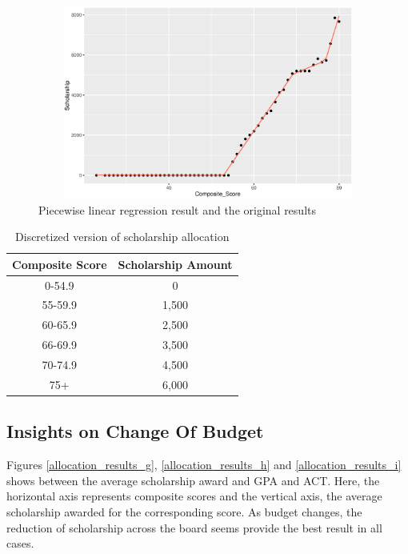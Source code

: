 \documentclass[12pt,english]{report}
\begin{document}
\begin{figure}[ht]
   \centering
 \includegraphics[width=6in, height=2.5in]{pic/PieceWiseRegression.eps}
 \caption{Piecewise linear regression result and the original results}
 \label{PieceWisePolicy}
\end{figure}

\begin{table}[H]
\centering
\begin{tabular}{|c|c|} \hline
Composite Score & Scholarship Amount \\ \hline
0-54.9         & 0              \\ \hline
55-59.9         & 1,500              \\ \hline
60-65.9         & 2,500              \\ \hline
66-69.9         & 3,500              \\ \hline
70-74.9         & 4,500              \\ \hline
75+             & 6,000              \\ \hline
\end{tabular}
\caption{Discretized version of scholarship allocation}
\label{money_result_discrete}

\end{table}

\subsection{Insights on Change Of Budget}
Figures \ref{allocation_results_g}, \ref{allocation_results_h} and \ref{allocation_results_i} shows between the average scholarship award and GPA and ACT. Here, the horizontal axis represents composite scores and the vertical axis,  the average scholarship awarded for the corresponding score.  As budget changes, the reduction of scholarship across the board seems provide the best result in all cases. 
\end{document}
